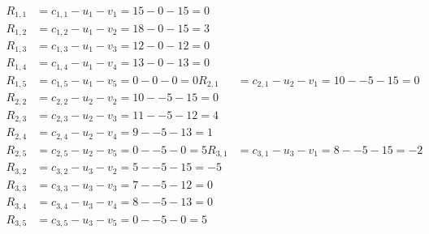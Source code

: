 \[
\begin{aligned}
R_{1,1} &= c_{1,1} - u_{1} - v_{1} = 15 - 0 - 15 = 0 \\
R_{1,2} &= c_{1,2} - u_{1} - v_{2} = 18 - 0 - 15 = 3 \\
R_{1,3} &= c_{1,3} - u_{1} - v_{3} = 12 - 0 - 12 = 0 \\
R_{1,4} &= c_{1,4} - u_{1} - v_{4} = 13 - 0 - 13 = 0 \\
R_{1,5} &= c_{1,5} - u_{1} - v_{5} = 0 - 0 - 0 = 0 
R_{2,1} &= c_{2,1} - u_{2} - v_{1} = 10 - -5 - 15 = 0 \\
R_{2,2} &= c_{2,2} - u_{2} - v_{2} = 10 - -5 - 15 = 0 \\
R_{2,3} &= c_{2,3} - u_{2} - v_{3} = 11 - -5 - 12 = 4 \\
R_{2,4} &= c_{2,4} - u_{2} - v_{4} = 9 - -5 - 13 = 1 \\
R_{2,5} &= c_{2,5} - u_{2} - v_{5} = 0 - -5 - 0 = 5 
R_{3,1} &= c_{3,1} - u_{3} - v_{1} = 8 - -5 - 15 = -2 \\
R_{3,2} &= c_{3,2} - u_{3} - v_{2} = 5 - -5 - 15 = -5 \\
R_{3,3} &= c_{3,3} - u_{3} - v_{3} = 7 - -5 - 12 = 0 \\
R_{3,4} &= c_{3,4} - u_{3} - v_{4} = 8 - -5 - 13 = 0 \\
R_{3,5} &= c_{3,5} - u_{3} - v_{5} = 0 - -5 - 0 = 5 
\end{aligned}
\]

